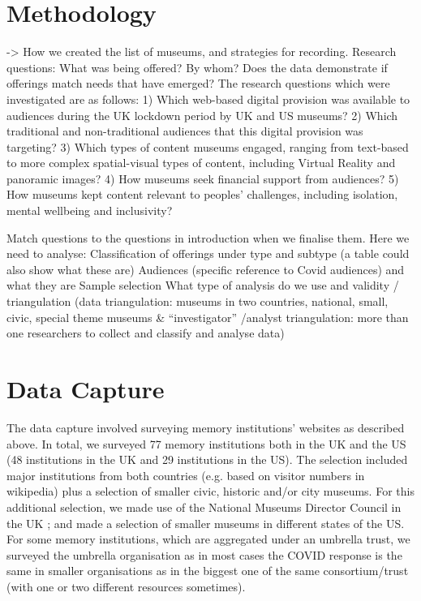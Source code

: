 \documentclass{egpubl}
\begin{document}
\section{Methodology}
-> How we created the list of museums, and strategies for recording.
Research questions:
What  was being offered? By whom?
Does the data demonstrate if offerings match needs that have emerged?
The research questions which were investigated are as follows:
1) Which web-based digital provision was available to audiences during the UK lockdown period by UK and US museums? 
2) Which traditional and non-traditional audiences that this digital provision was targeting?
3) Which types of content museums engaged, ranging from text-based to more complex spatial-visual types of content, including Virtual Reality and panoramic images?
4) How museums seek financial support from audiences?
5) How museums kept content relevant to peoples’ challenges, including isolation, mental wellbeing and inclusivity?

Match questions to the questions in introduction when we finalise them.
Here we need to analyse:
Classification of offerings under type and subtype (a table could also show what these are)
Audiences (specific reference to Covid audiences) and what they are
Sample selection 
What type of analysis do we use and validity / triangulation (data triangulation: museums in two countries, national, small, civic, special theme museums \& “investigator” /analyst  triangulation: more than one researchers to collect and classify and analyse data)


\section{Data Capture}
The data capture involved surveying memory institutions’ websites as described above. In total, we surveyed 77 memory institutions both in the UK and the US (48 institutions in the  UK and 29 institutions in the US). The selection included major institutions from both countries (e.g. based on visitor numbers in wikipedia) plus a selection of smaller civic, historic and/or city museums. For this additional selection, we made use of the National Museums Director Council in the UK \cite{nationalmuseums:2020}; and made a selection of smaller museums in different states of the US. For some memory institutions, which are aggregated under an umbrella trust, we surveyed the umbrella organisation as in most cases the COVID response is the same in smaller organisations as in the biggest one of the same consortium/trust (with one or two different resources sometimes).
\end{document}
